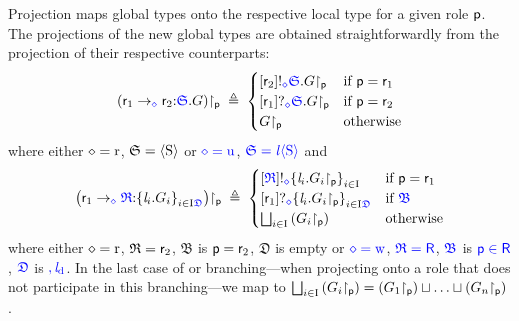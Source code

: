 Projection maps global types onto the respective local type for a given role $ \Role[p] $.
The projections of the new global types are obtained straightforwardly from the projection of their respective \strongR counterparts:
\begin{align*}
	\Proj{\left( \Role_1 \to_{\textcolor{blue}{\diamond}} \Role_2{:}{\textcolor{blue}{\mathfrak{S}}}.\GT \right)}{\Role[p]} \deff
	\begin{cases}
		{\left[ \Role_2 \right]}\mathsf{!}_{\textcolor{blue}{\diamond}}{\textcolor{blue}{\mathfrak{S}}}.{\Proj{\GT}{\Role[p]}} & \text{if } \Role[p] = \Role_1\\
		{\left[ \Role_1 \right]}\mathsf{?}_{\textcolor{blue}{\diamond}}{\textcolor{blue}{\mathfrak{S}}}.{\Proj{\GT}{\Role[p]}} & \text{if } \Role[p] = \Role_2\\
		\Proj{\GT}{\Role[p]} & \text{otherwise}
	\end{cases}
\end{align*}
where either $ \diamond = \iR $, $ \mathfrak{S} = {\left< \Sort \right>} $ or $ \textcolor{blue}{\diamond = \iU} $, $ \textcolor{blue}{\mathfrak{S} = \Label{\left< \Sort \right>}} $ and
\begin{align*}
	\Proj{\left( \Role_1 \to_{\textcolor{blue}{\diamond}} \textcolor{blue}{\mathfrak{R}}{:}{\Set{ \Label_i.\GT_i }_{i \in \indexSet \textcolor{blue}{\mathfrak{D}}}} \right)}{\Role[p]} \deff
	\begin{cases}
		{\left[ \textcolor{blue}{\mathfrak{R}} \right]}\mathsf{!}_{\textcolor{blue}{\diamond}}{\Set{ \Label_i.\Proj{\GT_i}{\Role[p]} }_{i \in \indexSet}} & \text{if } \Role[p] = \Role_1\\
		{\left[ \Role_1 \right]}\mathsf{?}_{\textcolor{blue}{\diamond}}{\Set{ \Label_i.\Proj{\GT_i}{\Role[p]} }_{i \in \indexSet \textcolor{blue}{\mathfrak{D}}}} & \text{if } \textcolor{blue}{\mathfrak{B}}\\
		\bigsqcup_{i \in \indexSet} \left( \Proj{\GT_i}{\Role[p]} \right) & \text{otherwise}
	\end{cases}
\end{align*}
where either $ \diamond = \iR $, $ \mathfrak{R} = \Role_2 $, $ \mathfrak{B} $ is $ \Role[p] = \Role_2 $, $ \mathfrak{D} $ is empty or $ \textcolor{blue}{\diamond = \iW} $, $ \textcolor{blue}{\mathfrak{R} = \Role[R]} $, $ \textcolor{blue}{\mathfrak{B}} $ is $ \textcolor{blue}{\Role[p] \in \Role[R]} $, $ \textcolor{blue}{\mathfrak{D}} $ is $ \textcolor{blue}{, \LabelD} $.
In the last case of \strongR or \weakR branching---when projecting onto a role that does not participate in this branching---we map to $ \bigsqcup_{i \in \indexSet} \left( \Proj{\GT_i}{\Role[p]} \right) = \left( \Proj{\GT_1}{\Role[p]} \right) \sqcup \ldots \sqcup \left( \Proj{\GT_n}{\Role[p]} \right) $.
